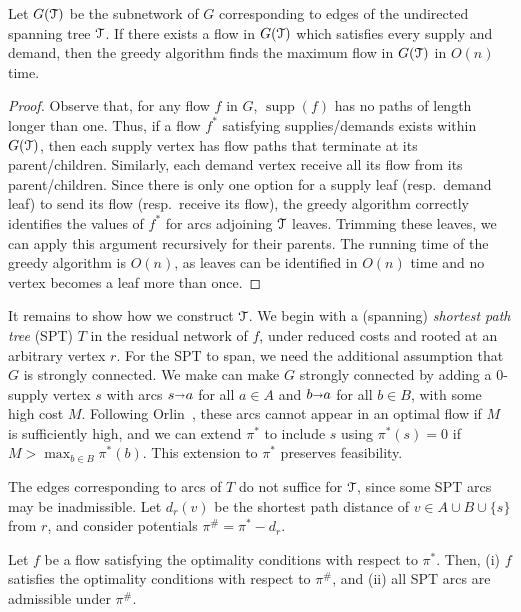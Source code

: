 \documentclass[a4paper,UKenglish]{socg-lipics-v2018}
\def\arcto{\mathord\shortrightarrow}
\def\arc#1#2{#1\arcto#2}
\def\supp{\operatorname{supp}}
\theoremstyle{plain}
\numberwithin{figure}{section}
\def\EMPH#1{\textcolor{BrickRed}{{\emph{#1}}}}
\begin{document}
\begin{toappendix}
\begin{lemma}
\label{lemma:orlin_tree_flow}
Let $G(\EuScript{T})$ be the subnetwork of $G$ corresponding to edges of the
undirected spanning tree $\EuScript{T}$.
If there exists a flow in $G(\EuScript{T})$ which satisfies every supply and demand,
then the greedy algorithm finds the maximum flow in $G(\EuScript{T})$ in $O(n)$ time.
\end{lemma}
\begin{proof}
Observe that, for any flow $f$ in $G$, $\supp(f)$ has no paths of length longer
than one.
Thus, if a flow $f^*$ satisfying supplies/demands exists within $G(\EuScript{T})$,
then each supply vertex has flow paths that terminate at its parent/children.
Similarly, each demand vertex receive all its flow from its parent/children.
Since there is only one option for a supply leaf (resp.\ demand leaf) to send
its flow (resp.\ receive its flow), the greedy algorithm correctly identifies
the values of $f^*$ for arcs adjoining $\EuScript{T}$ leaves.
Trimming these leaves, we can apply this argument recursively for their parents.
The running time of the greedy algorithm is $O(n)$, as leaves can be identified
in $O(n)$ time and no vertex becomes a leaf more than once.
\end{proof}

It remains to show how we construct $\EuScript{T}$.
We begin with a (spanning) \EMPH{shortest path tree} (SPT) $T$ in the residual
network of $f$, under reduced costs and rooted at an arbitrary vertex $r$.
For the SPT to span, we need the additional assumption that $G$ is strongly
connected.
We make can make $G$ strongly connected by adding a 0-supply vertex $s$ with
arcs $\arc sa$ for all $a \in A$ and $\arc ba$ for all $b \in B$, with some
high cost $M$.
Following Orlin~\cite{O93}, these arcs cannot appear in an optimal flow if $M$
is sufficiently high, and we can extend $\pi^*$ to include $s$ using
$\pi^*(s) = 0$ if $M > \max_{b \in B} \pi^*(b)$.
This extension to $\pi^*$ preserves feasibility.

The edges corresponding to arcs of $T$ do not suffice for $\EuScript{T}$, since
some SPT arcs may be inadmissible.
Let $d_r(v)$ be the shortest path distance of $v \in A \cup B \cup \{s\}$ from
$r$, and consider potentials $\pi^\# = \pi^* - d_r$.

\begin{lemma}
\label{lemma:orlin_spt_dist}
Let $f$ be a flow satisfying the optimality conditions with respect to $\pi^*$.
Then, (i) $f$ satisfies the optimality conditions with respect to $\pi^\#$, and
(ii) all SPT arcs are admissible under $\pi^\#$.
\end{lemma}


\end{toappendix}
\end{document}
